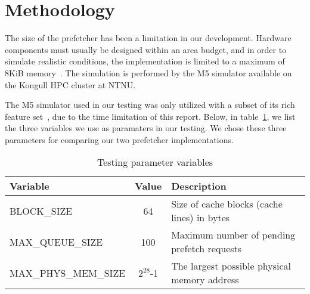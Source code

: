 \section{Methodology}

The size of the prefetcher has been a limitation in our development. Hardware
components must usually be designed within an area budget, and in order to
simulate realistic conditions, the implementation is limited to a maximum of
8KiB memory~\cite{guidelines}. The simulation is performed by the M5 simulator available on the Kongull HPC cluster at NTNU.

The M5 simulator used in our testing was only utilized with a subset of its rich
feature set~\cite{user_doc}, due to the time limitation of this report.
 Below, in table~\ref{tab:test-params}, we
list the three variables we use as paramaters in our testing. We chose these
three parameters for comparing our two prefetcher implementations.

\begin{table}[h]
	\caption{Testing parameter variables}
	\begin{tabularx}{\linewidth}{|X|c|X|}
	\hline
	Variable & Value & Description \\
	\hline
	BLOCK\_SIZE & 64 & Size of cache blocks (cache lines) in bytes \\
	\hline
	MAX\_QUEUE\_SIZE & 100 & Maximum number of pending prefetch requests \\
	\hline
	MAX\_PHYS\_MEM\_SIZE & $2^{28}$-1 & The largest possible physical memory address \\
	\hline
	\end{tabularx}
	\label{tab:test-params}
\end{table}

